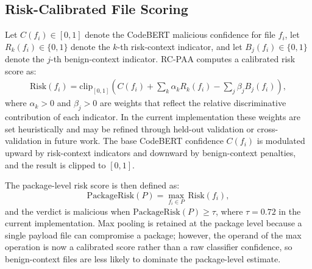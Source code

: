 \documentclass[conference,a4paper]{IEEEtran}
\newcommand{\rcpaa}{RC-PAA}
\newcommand{\codebert}{CodeBERT}
\newcommand{\risk}{\mathrm{Risk}}
\newcommand{\prisk}{\mathrm{PackageRisk}}
\begin{document}
\subsection{Risk-Calibrated File Scoring}
Let $C(f_i) \in [0,1]$ denote the \codebert{} malicious confidence for file $f_i$,
let $R_k(f_i) \in \{0,1\}$ denote the $k$-th risk-context indicator, and let
$B_j(f_i) \in \{0,1\}$ denote the $j$-th benign-context indicator. \rcpaa{}
computes a calibrated risk score as:
\begin{equation}
\begin{split}
\risk(f_i) = \mathrm{clip}_{[0,1]}\!\left(C(f_i)
  + \sum_k \alpha_k R_k(f_i)
  - \sum_j \beta_j B_j(f_i)\right),
\end{split}
\label{eq:file-risk}
\end{equation}
where $\alpha_k > 0$ and $\beta_j > 0$ are weights that reflect the relative
discriminative contribution of each indicator. In the current implementation these
weights are set heuristically and may be refined through held-out validation or
cross-validation in future work. The base \codebert{} confidence $C(f_i)$ is modulated
upward by risk-context indicators and downward by benign-context penalties, and the
result is clipped to $[0,1]$.

The package-level risk score is then defined as:
\begin{equation}
\prisk(P) = \max_{f_i \in P}\, \risk(f_i),
\label{eq:package-risk}
\end{equation}
and the verdict is malicious when $\prisk(P) \geq \tau$, where $\tau = 0.72$ in
the current implementation. Max pooling is retained at the package level because a
single payload file can compromise a package; however, the operand of the max
operation is now a calibrated score rather than a raw classifier confidence, so benign-context files are less likely to dominate the package-level estimate.
\end{document}

